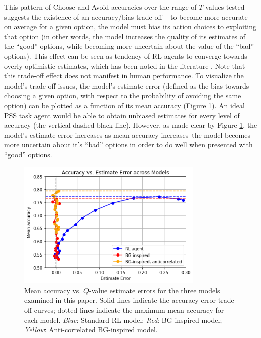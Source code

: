 \documentclass[10pt,letterpaper]{article}
\begin{document}
This pattern of Choose and Avoid accuracies over the range of $T$ values tested suggests the existence of an accuracy/bias trade-off -- to become more accurate on average for a given option, the model must bias its action choices to exploiting that option (in other words, the model increases the quality of its estimates of the ``good'' options, while becoming more uncertain about the value of the ``bad'' options). This effect can be seen as tendency of RL agents to converge towards overly optimistic estimates, which has been noted in the literature \cite{hasselt2010double}. Note that this trade-off effect does not manifest in human performance. To visualize the model's trade-off issues, the model's estimate error (defined as the bias towards choosing a given option, with respect to the probability of avoiding the same option) can be plotted as a function of its mean accuracy (Figure \ref{roc}). An ideal PSS task agent would be able to obtain unbiased estimates for every level of accuracy (the vertical dashed black line). However, as made clear by Figure \ref{roc}, the model's estimate error increases as mean accuracy increases--the model becomes more uncertain about it’s ``bad'' options in order to do well when presented with ``good'' options.

\begin{figure}[ht]
	\begin{center}
		\includegraphics[width=3.5in]{roc-agents.png}
	\end{center}
	\caption{Mean accuracy vs. $Q$-value estimate errors for the three models examined in this paper. Solid lines indicate the accuracy-error trade-off curves; dotted lines indicate the maximum mean accuracy for each model. \emph{Blue}: Standard RL model; \emph{Red}: BG-inspired model; \emph{Yellow}: Anti-correlated BG-inspired model. } 
	\label{roc}
\end{figure}
\end{document}
